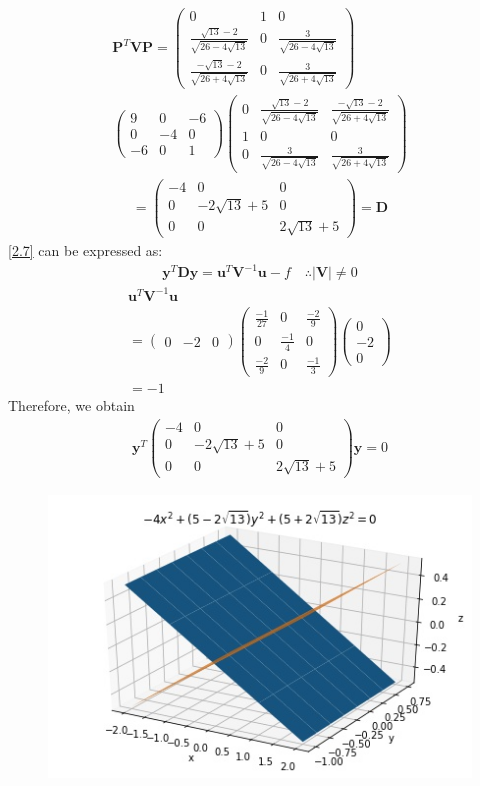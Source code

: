 \documentclass[journal,12pt,twocolumn]{IEEEtran}
\let\vec\mathbf
\numberwithin{equation}{subsection}
\newcommand{\myvec}[1]{\ensuremath{\begin{pmatrix}#1\end{pmatrix}}}
\begin{document}
\begin{enumerate}
\begin{enumerate}
\begin{multline}
\vec{P}^T\vec{V}\vec{P}= \myvec{0&1&0\\
\frac{\sqrt{13} -2}{\sqrt{26-4\sqrt{13}}}&0&\frac{3}{\sqrt{26-4\sqrt{13}}}\\
\frac{-\sqrt{13} -2}{\sqrt{26+4\sqrt{13}}}&0&\frac{3}{\sqrt{26+4\sqrt{13}}}
}  \\ \myvec{9&0&-6\\0&-4&0\\-6&0&1}   
\myvec{0 &\frac{\sqrt{13} -2}{\sqrt{26-4\sqrt{13}}}&\frac{-\sqrt{13} -2}{\sqrt{26+4\sqrt{13}}}\\1 &0&0\\0&\frac{3}{\sqrt{26-4\sqrt{13}}}&\frac{3}{\sqrt{26+4\sqrt{13}}}}
\end{multline}
\begin{align}
=\myvec{-4&0&0\\0&-2\sqrt{13}+5&0\\0&0&2\sqrt{13}+5} = \vec{D}
\end{align}
 \eqref{2.7}  can be expressed as:
\begin{align}
\vec{y}^T\vec{D}\vec{y} = \vec{u}^T\vec{V}^{-1}\vec{u} -f   \quad     \wasytherefore |\vec{V}| \neq 0
\end{align}
\begin{multline}
\vec{u}^T\vec{V}^{-1}\vec{u} \\= \myvec{0&-2&0} \myvec{\frac{-1}{27} & 0 &\frac{-2}{9}\\ 0 & \frac{-1}{4} & 0 \\ \frac{-2}{9} & 0 &\frac{-1}{3}}\myvec{0\\-2\\0}\\=-1
\end{multline}
Therefore, we obtain
\begin{align}
\vec{y}^T\myvec{-4&0&0\\0&-2\sqrt{13}+5&0\\0&0&2\sqrt{13}+5}\vec{y} = 0  \label{2.27.1}
\end{align}
\begin{figure}[h]
    \centering
    \includegraphics[width=\columnwidth]{planes.jpg}

\end{figure}
\end{enumerate}
\end{enumerate}
\end{document}
